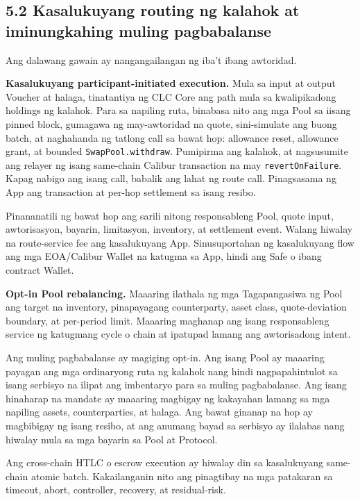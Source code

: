 \documentclass[11pt]{article}
\begin{document}
\subsection*{5.2 Kasalukuyang routing ng kalahok at iminungkahing muling pagbabalanse}

Ang dalawang gawain ay nangangailangan ng iba't ibang awtoridad.

\textbf{Kasalukuyang participant-initiated execution.} Mula sa input at output Voucher at halaga, tinatantiya ng CLC Core ang path mula sa kwalipikadong holdings ng kalahok. Para sa napiling ruta, binabasa nito ang mga Pool sa iisang pinned block, gumagawa ng may-awtoridad na quote, sini-simulate ang buong batch, at naghahanda ng tatlong call sa bawat hop: allowance reset, allowance grant, at bounded \texttt{SwapPool.withdraw}. Pumipirma ang kalahok, at nagsusumite ang relayer ng isang same-chain Calibur transaction na may \texttt{revertOnFailure}. Kapag nabigo ang isang call, babalik ang lahat ng route call. Pinagsasama ng App ang transaction at per-hop settlement sa isang resibo.

Pinananatili ng bawat hop ang sarili nitong responsableng Pool, quote input, awtorisasyon, bayarin, limitasyon, inventory, at settlement event. Walang hiwalay na route-service fee ang kasalukuyang App. Sinusuportahan ng kasalukuyang flow ang mga EOA/Calibur Wallet na katugma sa App, hindi ang Safe o ibang contract Wallet.

\textbf{Opt-in Pool rebalancing.} Maaaring ilathala ng mga Tagapangasiwa ng Pool ang target na inventory, pinapayagang counterparty, asset class, quote-deviation boundary, at per-period limit. Maaaring maghanap ang isang responsableng service ng katugmang cycle o chain at ipatupad lamang ang awtorisadong intent.

Ang muling pagbabalanse ay magiging opt-in. Ang isang Pool ay maaaring payagan ang mga ordinaryong ruta ng kalahok nang hindi nagpapahintulot sa isang serbisyo na ilipat ang imbentaryo para sa muling pagbabalanse. Ang isang hinaharap na mandate ay maaaring magbigay ng kakayahan lamang sa mga napiling assets, counterparties, at halaga. Ang bawat ginanap na hop ay magbibigay ng isang resibo, at ang anumang bayad sa serbisyo ay ilalabas nang hiwalay mula sa mga bayarin sa Pool at Protocol.

Ang cross-chain HTLC o escrow execution ay hiwalay din sa kasalukuyang same-chain atomic batch. Kakailanganin nito ang pinagtibay na mga patakaran sa timeout, abort, controller, recovery, at residual-risk.
\end{document}
